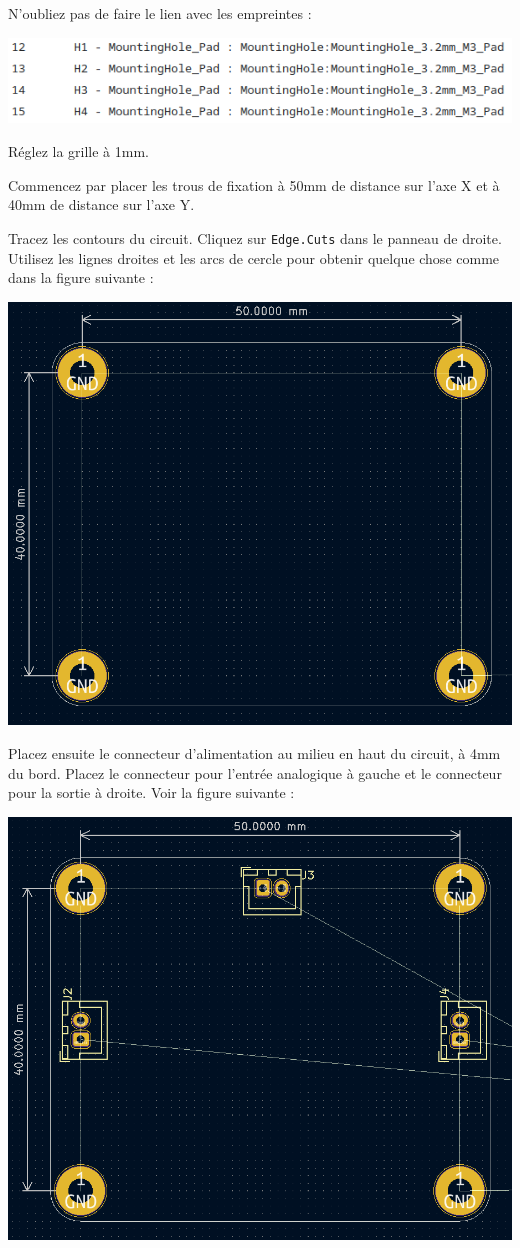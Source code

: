\documentclass[12pt,%
addpoints,%
]{exam}
\begin{document}
\begin{questions}
	\question N'oubliez pas de faire le lien avec les empreintes :

	\begin{center}
        \includegraphics[width=.8\linewidth]{figures/kicad20.png}
    \end{center}

	\question Réglez la grille à 1mm.

	\question Commencez par placer les trous de fixation à 50mm de distance sur l'axe X et à 40mm de distance sur l'axe Y.

	\question Tracez les contours du circuit. Cliquez sur \texttt{Edge.Cuts} dans le panneau de droite. 
		Utilisez les lignes droites et les arcs de cercle pour obtenir quelque chose comme dans la figure suivante :

	\begin{center}
        \includegraphics[width=.7\linewidth]{figures/kicad21.png}
    \end{center}

	\question Placez ensuite le connecteur d'alimentation au milieu en haut du circuit, à 4mm du bord.
	Placez le connecteur pour l'entrée analogique à gauche et le connecteur pour la sortie à droite.
	Voir la figure suivante :
	\begin{center}
        \includegraphics[width=.7\linewidth]{figures/kicad22.png}
    \end{center}


\end{questions}
\end{document}
